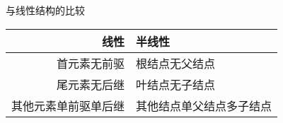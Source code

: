 \begin{frame}
    \frametitle{\insertsectionhead}
    \begin{block}{与线性结构的比较}
        \begin{table}
            \begin{tabular}{rl}
                \toprule
                \textbf{线性} & \textbf{半线性} \\
                \midrule
                首元素无前驱 & 根结点无父结点 \\
                尾元素无后继 & 叶结点无子结点 \\
                其他元素单前驱单后继 & 其他结点单父结点\alert{多}子结点 \\
                \bottomrule
            \end{tabular}
        \end{table}
    \end{block}
\end{frame}
